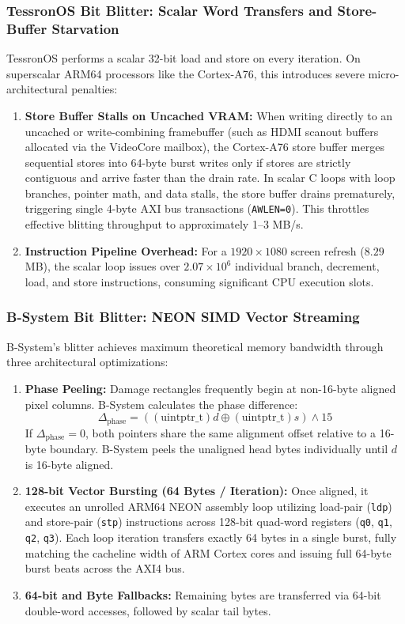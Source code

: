 \documentclass[10pt,journal,compsoc,twocolumn]{article}
\begin{document}
\subsubsection{TessronOS Bit Blitter: Scalar Word Transfers and Store-Buffer Starvation}
TessronOS performs a scalar 32-bit load and store on every iteration. On superscalar ARM64 processors like the Cortex-A76, this introduces severe micro-architectural penalties:
\begin{enumerate}[leftmargin=*]
    \item \textbf{Store Buffer Stalls on Uncached VRAM:} When writing directly to an uncached or write-combining framebuffer (such as HDMI scanout buffers allocated via the VideoCore mailbox), the Cortex-A76 store buffer merges sequential stores into 64-byte burst writes only if stores are strictly contiguous and arrive faster than the drain rate. In scalar C loops with loop branches, pointer math, and data stalls, the store buffer drains prematurely, triggering single 4-byte AXI bus transactions (\texttt{AWLEN=0}). This throttles effective blitting throughput to approximately 1--3 MB/s.
    \item \textbf{Instruction Pipeline Overhead:} For a $1920 \times 1080$ screen refresh ($8.29$ MB), the scalar loop issues over $2.07 \times 10^6$ individual branch, decrement, load, and store instructions, consuming significant CPU execution slots.
\end{enumerate}

\subsubsection{B-System Bit Blitter: NEON SIMD Vector Streaming}
B-System's blitter achieves maximum theoretical memory bandwidth through three architectural optimizations:
\begin{enumerate}[leftmargin=*]
    \item \textbf{Phase Peeling:} Damage rectangles frequently begin at non-16-byte aligned pixel columns. B-System calculates the phase difference:
    \begin{equation}
    \Delta_{\text{phase}} = ((\text{uintptr\_t})d \oplus (\text{uintptr\_t})s) \land 15
    \end{equation}
    If $\Delta_{\text{phase}} = 0$, both pointers share the same alignment offset relative to a 16-byte boundary. B-System peels the unaligned head bytes individually until $d$ is 16-byte aligned.
    \item \textbf{128-bit Vector Bursting (64 Bytes / Iteration):} Once aligned, it executes an unrolled ARM64 NEON assembly loop utilizing load-pair (\texttt{ldp}) and store-pair (\texttt{stp}) instructions across 128-bit quad-word registers (\texttt{q0}, \texttt{q1}, \texttt{q2}, \texttt{q3}). Each loop iteration transfers exactly 64 bytes in a single burst, fully matching the cacheline width of ARM Cortex cores and issuing full 64-byte burst beats across the AXI4 bus.
    \item \textbf{64-bit and Byte Fallbacks:} Remaining bytes are transferred via 64-bit double-word accesses, followed by scalar tail bytes.
\end{enumerate}
\end{document}
